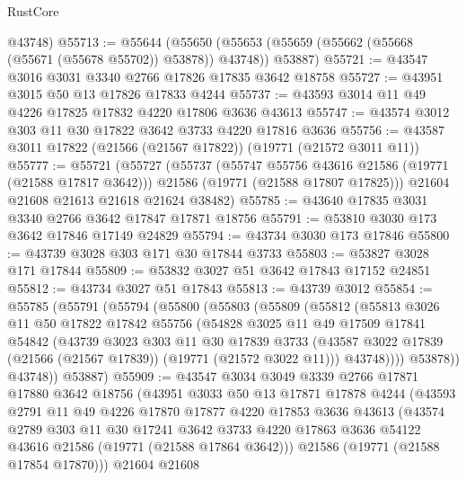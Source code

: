 \begin{lexlean}{RustCore}
\begin{coremodule}
      @43748)
@55713 := @55644
    (@55650 (@55653 (@55659 (@55662 (@55668 (@55671 (@55678 @55702)) @53878)) @43748)) @53887)
@55721 := @43547 @3016 @3031 @3340 @2766 @17826 @17835 @3642 @18758
@55727 := @43951 @3015 @50 @13 @17826 @17833 @4244
@55737 := @43593 @3014 @11 @49 @4226 @17825 @17832 @4220 @17806 @3636 @43613
@55747 := @43574 @3012 @303 @11 @30 @17822 @3642 @3733 @4220 @17816 @3636
@55756 := @43587 @3011 @17822 (@21566 (@21567 @17822)) (@19771 (@21572 @3011 @11))
@55777 := @55721
    (@55727
      (@55737
        (@55747 @55756 @43616 @21586 (@19771 (@21588 @17817 @3642)))
        @21586
        (@19771 (@21588 @17807 @17825)))
      @21604
      @21608
      @21613
      @21618
      @21624
      @38482)
@55785 := @43640 @17835 @3031 @3340 @2766 @3642 @17847 @17871 @18756
@55791 := @53810 @3030 @173 @3642 @17846 @17149 @24829
@55794 := @43734 @3030 @173 @17846
@55800 := @43739 @3028 @303 @171 @30 @17844 @3733
@55803 := @53827 @3028 @171 @17844
@55809 := @53832 @3027 @51 @3642 @17843 @17152 @24851
@55812 := @43734 @3027 @51 @17843
@55813 := @43739 @3012
@55854 := @55785
    (@55791
      (@55794
        (@55800
          (@55803
            (@55809
              (@55812
                (@55813
                  @3026
                  @11
                  @50
                  @17822
                  @17842
                  @55756
                  (@54828
                    @3025
                    @11
                    @49
                    @17509
                    @17841
                    @54842
                    (@43739
                      @3023
                      @303
                      @11
                      @30
                      @17839
                      @3733
                      (@43587 @3022 @17839 (@21566 (@21567 @17839)) (@19771 (@21572 @3022 @11)))
                      @43748))))
              @53878))
          @43748))
      @53887)
@55909 := @43547
    @3034
    @3049
    @3339
    @2766
    @17871
    @17880
    @3642
    @18756
    (@43951
      @3033
      @50
      @13
      @17871
      @17878
      @4244
      (@43593
        @2791
        @11
        @49
        @4226
        @17870
        @17877
        @4220
        @17853
        @3636
        @43613
        (@43574
          @2789
          @303
          @11
          @30
          @17241
          @3642
          @3733
          @4220
          @17863
          @3636
          @54122
          @43616
          @21586
          (@19771 (@21588 @17864 @3642)))
        @21586
        (@19771 (@21588 @17854 @17870)))
      @21604
      @21608

\end{coremodule}
\end{lexlean}
